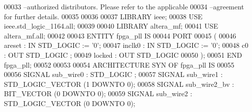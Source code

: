 \begin{DoxyCode}
{00033 \textcolor{keyword}{--authorized distributors.  Please refer to the applicable }
00034 \textcolor{keyword}{--agreement for further details.}
00035 
00036 
00037 \textcolor{vhdlkeyword}{LIBRARY }\textcolor{keywordflow}{ieee};
00038 \textcolor{vhdlkeyword}{USE }ieee.std\_logic\_1164.\textcolor{keywordflow}{all};
00039 
00040 \textcolor{vhdlkeyword}{LIBRARY }\textcolor{keywordflow}{altera\_mf};
00041 \textcolor{vhdlkeyword}{USE }\textcolor{keywordflow}{altera\_mf.all};
00042 
00043 \textcolor{keywordflow}{ENTITY }fpga_pll \textcolor{keywordflow}{IS}
00044     \textcolor{keywordflow}{PORT}
00045     \textcolor{vhdlchar}{(}
00046         \textcolor{vhdlchar}{areset}      \textcolor{vhdlchar}{:} \textcolor{keywordflow}{IN} \textcolor{comment}{STD\_LOGIC}  \textcolor{vhdlchar}{:=} \textcolor{vhdlchar}{'}\textcolor{vhdllogic}{}\textcolor{vhdllogic}{0}\textcolor{vhdlchar}{'};
00047         \textcolor{vhdlchar}{inclk0}      \textcolor{vhdlchar}{:} \textcolor{keywordflow}{IN} \textcolor{comment}{STD\_LOGIC}  \textcolor{vhdlchar}{:=} \textcolor{vhdlchar}{'}\textcolor{vhdllogic}{}\textcolor{vhdllogic}{0}\textcolor{vhdlchar}{'};
00048         \textcolor{vhdlchar}{c0}      \textcolor{vhdlchar}{:} \textcolor{keywordflow}{OUT} \textcolor{comment}{STD\_LOGIC} ;
00049         locked      : \textcolor{keywordflow}{OUT} \textcolor{comment}{STD\_LOGIC} 
00050     \textcolor{vhdlchar}{)};
00051 \textcolor{keywordflow}{END} \textcolor{vhdlchar}{fpga\_pll};
00052 
00053 
00054 \textcolor{keywordflow}{ARCHITECTURE} SYN \textcolor{keywordflow}{OF} fpga_pll IS
00055 
00056     \textcolor{keywordflow}{SIGNAL} \textcolor{vhdlchar}{sub_wire0}    \textcolor{vhdlchar}{:} \textcolor{comment}{STD\_LOGIC} ;
00057     \textcolor{keywordflow}{SIGNAL} \textcolor{vhdlchar}{sub_wire1}    \textcolor{vhdlchar}{:} \textcolor{comment}{STD\_LOGIC\_VECTOR} \textcolor{vhdlchar}{(}\textcolor{vhdllogic}{}\textcolor{vhdllogic}{1} \textcolor{keywordflow}{DOWNTO} \textcolor{vhdllogic}{}\textcolor{vhdllogic}{0}\textcolor{vhdlchar}{)};
00058     \textcolor{keywordflow}{SIGNAL} \textcolor{vhdlchar}{sub_wire2_bv} \textcolor{vhdlchar}{:} \textcolor{comment}{BIT\_VECTOR} \textcolor{vhdlchar}{(}\textcolor{vhdllogic}{}\textcolor{vhdllogic}{0} \textcolor{keywordflow}{DOWNTO} \textcolor{vhdllogic}{}\textcolor{vhdllogic}{0}\textcolor{vhdlchar}{)};
00059     \textcolor{keywordflow}{SIGNAL} \textcolor{vhdlchar}{sub_wire2}    \textcolor{vhdlchar}{:} \textcolor{comment}{STD\_LOGIC\_VECTOR} \textcolor{vhdlchar}{(}\textcolor{vhdllogic}{}\textcolor{vhdllogic}{0} \textcolor{keywordflow}{DOWNTO} \textcolor{vhdllogic}{}\textcolor{vhdllogic}{0}\textcolor{vhdlchar}{)};
}
\end{DoxyCode}
